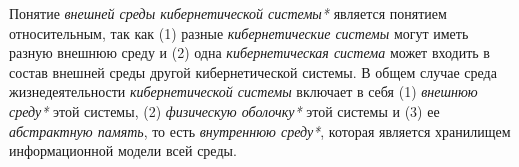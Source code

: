 Понятие \textit{внешней среды кибернетической системы*} является понятием относительным, так как (1) разные \textit{кибернетические системы} могут иметь разную внешнюю среду и (2) одна \textit{кибернетическая система} может входить в состав внешней среды другой кибернетической системы. 
В общем случае среда жизнедеятельности \textit{кибернетической системы} включает в себя (1) \textit{внешнюю среду*} этой системы, (2) \textit{физическую оболочку*} этой системы и (3) ее \textit{абстрактную память}, то есть \textit{внутреннюю среду*}, которая является хранилищем информационной модели всей среды.
